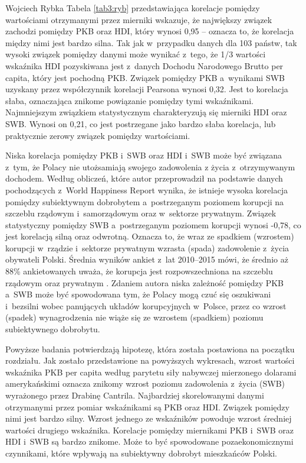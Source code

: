\begin{artplenv}{Wojciech Rybka}
Tabela \ref{tab3:ryb} przedstawiająca korelacje pomiędzy wartościami otrzymanymi przez mierniki wskazuje, że największy związek
zachodzi pomiędzy PKB oraz HDI, który wynosi 0,95 -- oznacza to, że korelacja między nimi jest bardzo silna. Tak
jak w~przypadku danych dla 103 państw, tak wysoki związek pomiędzy danymi może wynikać z~tego, że 1/3 wartości wskaźnika HDI
pozyskiwana jest z~danych Dochodu Narodowego Brutto per capita, który jest pochodną PKB. Związek pomiędzy
PKB a~wynikami SWB uzyskany przez współczynnik korelacji Pearsona wynosi 0,32. Jest to korelacja słaba, oznaczająca znikome
powiązanie pomiędzy tymi wskaźnikami. Najmniejszym związkiem statystycznym charakteryzują się mierniki HDI oraz SWB.
Wynosi on 0,21, co jest postrzegane jako bardzo słaba korelacja, lub praktycznie zerowy związek pomiędzy wartościami. 

Niska korelacja pomiędzy PKB i~SWB oraz HDI i~SWB może być związana z~tym, że Polacy nie utożsamiają swojego zadowolenia
z życia z~otrzymywanym dochodem. Według obliczeń, które autor przeprowadził na podstawie danych pochodzących z~World
Happiness Report wynika, że istnieje wysoka korelacja pomiędzy subiektywnym dobrobytem a~postrzeganym poziomem korupcji
na szczeblu rządowym i~samorządowym oraz w~sektorze prywatnym. Związek statystyczny pomiędzy SWB a~postrzeganym
poziomem korupcji wynosi -0,78, co jest korelacją silną oraz odwrotną. Oznacza to, że wraz ze spadkiem (wzrostem)
korupcji w~rządzie i~sektorze prywatnym wzrasta (spada) zadowolenie z~życia obywateli Polski. Średnia wyników
ankiet z~lat 2010--2015 mówi, że średnio aż 88\% ankietowanych uważa, że korupcja jest rozpowszechniona na szczeblu rządowym oraz
prywatnym
\parencite{noauthor_world_2018}.
Zdaniem autora niska zależność pomiędzy PKB a~SWB
może być spowodowana tym, że Polacy mogą czuć się oszukiwani i~bezsilni wobec panujących układów korupcyjnych w~Polsce,
przez co wzrost (spadek) wynagrodzenia nie wiąże się ze wzrostem (spadkiem) poziomu subiektywnego dobrobytu.

\enlargethispage{1\baselineskip}

Powyższe badania potwierdzają hipotezę, która została postawiona na początku rozdziału. Jak zostało przedstawione na
powyższych wykresach, wzrost wartości wskaźnika PKB per capita według parytetu siły nabywczej mierzonego dolarami
amerykańskimi oznacza znikomy wzrost poziomu zadowolenia z~życia (SWB) wyrażonego przez Drabinę Cantrila. Najbardziej
skorelowanymi danymi otrzymanymi przez pomiar wskaźnikami są PKB oraz HDI. Związek pomiędzy nimi jest bardzo silny.
Wzrost jednego ze wskaźników powoduje wzrost średniej wartości drugiego wskaźnika. Korelacje pomiędzy miernikami
PKB i~SWB oraz HDI i~SWB są bardzo znikome. Może to być spowodowane pozaekonomicznymi czynnikami, które wpływają na
subiektywny dobrobyt mieszkańców Polski.


\end{artplenv}
